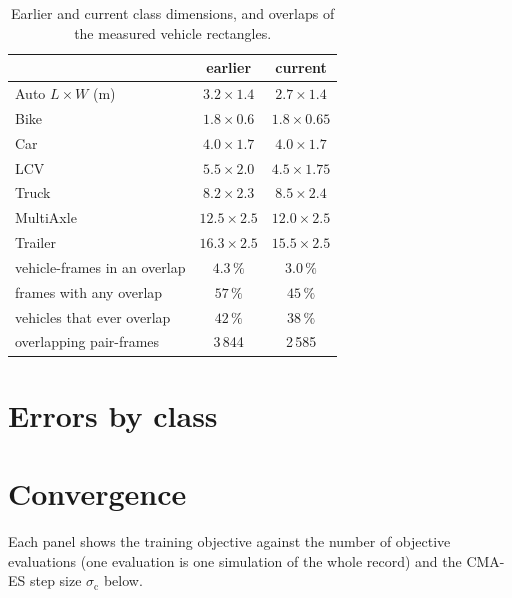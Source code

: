\documentclass[11pt]{article}
\begin{document}
\begin{table}[H]\centering\footnotesize
\caption{Earlier and current class dimensions, and overlaps of the measured
vehicle rectangles.}
\label{tab:dimcmp}
\begin{tabular}{@{}lcc@{}}
\toprule
& earlier & current\\
\midrule
Auto $L\times W$ (m) & $3.2\times1.4$ & $2.7\times1.4$\\
Bike & $1.8\times0.6$ & $1.8\times0.65$\\
Car & $4.0\times1.7$ & $4.0\times1.7$\\
LCV & $5.5\times2.0$ & $4.5\times1.75$\\
Truck & $8.2\times2.3$ & $8.5\times2.4$\\
MultiAxle & $12.5\times2.5$ & $12.0\times2.5$\\
Trailer & $16.3\times2.5$ & $15.5\times2.5$\\
\midrule
vehicle-frames in an overlap & $4.3\,\%$ & $3.0\,\%$\\
frames with any overlap & $57\,\%$ & $45\,\%$\\
vehicles that ever overlap & $42\,\%$ & $38\,\%$\\
overlapping pair-frames & 3\,844 & 2\,585\\
\bottomrule
\end{tabular}
\end{table}

\section{Errors by class}
\label{app:cls}
\begin{table}[H]\centering\footnotesize
\caption{Fixed IDM, single set \cite{chandra}: mean $F$ and pooled RMSE by class
(long.\ and lat.\ in m, speed in m/s).}

\end{table}
\begin{table}[H]\centering\footnotesize
\caption{Fixed IDM, per class \cite{duggal}: mean $F$ and pooled RMSE by class.}

\end{table}
\begin{table}[H]\centering\footnotesize
\caption{All parameters free: mean $F$ and pooled RMSE by class.}

\end{table}

\section{Convergence}
\label{app:conv}
Each panel shows the training objective against the number of objective
evaluations (one evaluation is one simulation of the whole record) and the
CMA-ES step size $\sigma_{\mathrm{c}}$ below.
\end{document}
